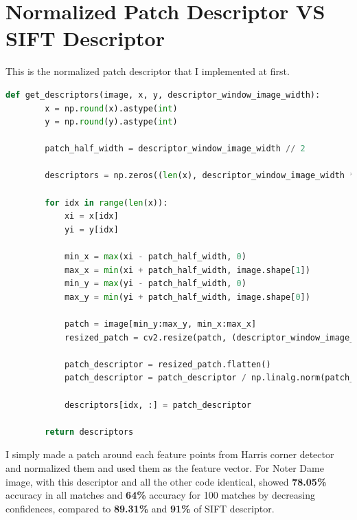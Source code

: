 \section*{Normalized Patch Descriptor VS SIFT Descriptor}
This is the normalized patch descriptor that I implemented at first.
\begin{lstlisting}[language=python]
    def get_descriptors(image, x, y, descriptor_window_image_width):
        x = np.round(x).astype(int)
        y = np.round(y).astype(int)

        patch_half_width = descriptor_window_image_width // 2

        descriptors = np.zeros((len(x), descriptor_window_image_width ** 2))

        for idx in range(len(x)):
            xi = x[idx]
            yi = y[idx]

            min_x = max(xi - patch_half_width, 0)
            max_x = min(xi + patch_half_width, image.shape[1])
            min_y = max(yi - patch_half_width, 0)
            max_y = min(yi + patch_half_width, image.shape[0])

            patch = image[min_y:max_y, min_x:max_x]
            resized_patch = cv2.resize(patch, (descriptor_window_image_width, descriptor_window_image_width))

            patch_descriptor = resized_patch.flatten()
            patch_descriptor = patch_descriptor / np.linalg.norm(patch_descriptor)

            descriptors[idx, :] = patch_descriptor

        return descriptors
\end{lstlisting}
I simply made a patch around each feature points from Harris corner detector and normalized them and used them as the feature vector.
For Noter Dame image, with this descriptor and all the other code identical, showed \textbf{78.05\%} accuracy in all matches and \textbf{64\%} accuracy for 100 matches by decreasing confidences, compared to \textbf{89.31\%} and \textbf{91\%} of SIFT descriptor.







